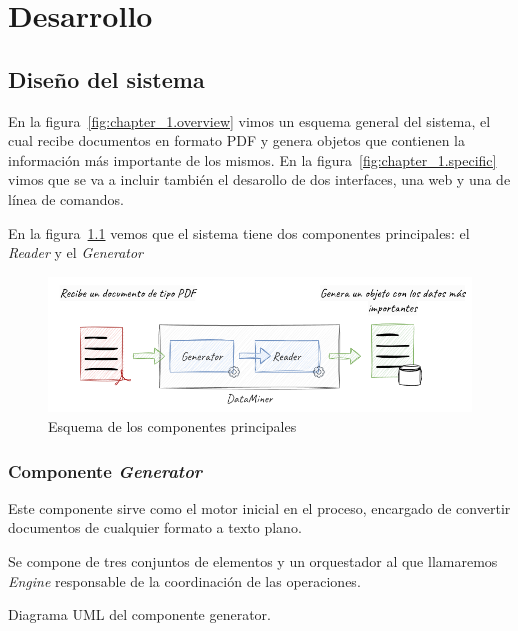 \chapter{Desarrollo}\label{ch:chapter_4}


\section{Diseño del sistema}

En la figura~\ref{fig:chapter_1.overview} vimos un esquema general del sistema, el cual recibe documentos en formato
PDF y genera objetos que contienen la información más importante de los mismos.
En la figura~\ref{fig:chapter_1.specific} vimos que se va a incluir también el desarollo de dos interfaces, una web
y una de línea de comandos.

En la figura~\ref{fig:chapter_4.overview} vemos que el sistema tiene dos componentes principales: el \textit{Reader}
y el \textit{Generator}

\begin{figure}
    \begin{center}
        \includegraphics[width=\textwidth]{./chapter/4/images/chapter_4.overview}
        \caption{Esquema de los componentes principales}
        \label{fig:chapter_4.overview}
    \end{center}
\end{figure}

\subsection*{Componente \textit{Generator}}

Este componente sirve como el motor inicial en el proceso, encargado de convertir documentos de cualquier formato a
texto plano.

Se compone de tres conjuntos de elementos y un orquestador al que llamaremos \textit{Engine} responsable de la
coordinación de las operaciones.

Diagrama UML del componente generator.


